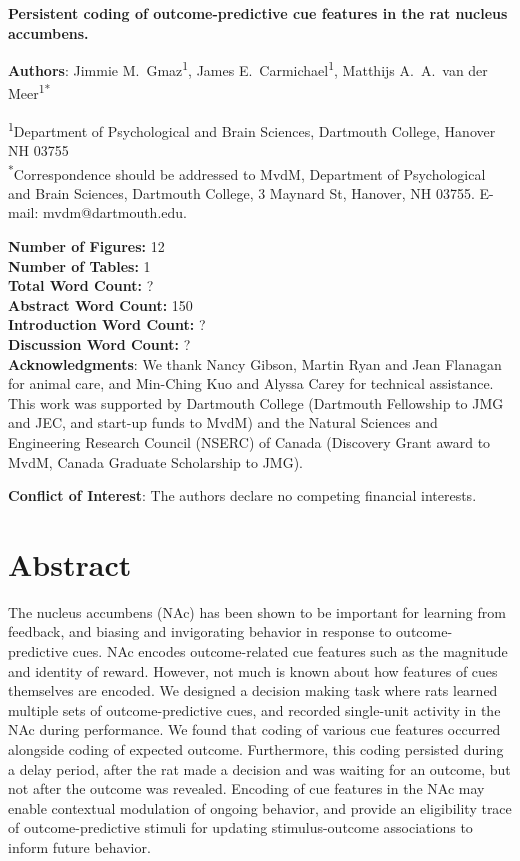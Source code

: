 \documentclass[11pt]{article}
\begin{document}
{\Large\bf Persistent coding of outcome-predictive cue features in the
  rat nucleus accumbens.}

{\bf Authors}: Jimmie M.\ Gmaz\textsuperscript{1}, James
E.\ Carmichael\textsuperscript{1}, Matthijs A.\ A.\ van der
Meer\textsuperscript{1*}

\textsuperscript{1}Department of Psychological and Brain Sciences,
Dartmouth College, Hanover NH
03755\\ 

\textsuperscript{*}Correspondence should be addressed to MvdM,
Department of Psychological and Brain Sciences, Dartmouth College, 3
Maynard St, Hanover, NH 03755. E-mail: {\sffamily mvdm@dartmouth.edu}.

\textbf{Number of Figures:} 12\\
\textbf{Number of Tables:} 1\\
\textbf{Total Word Count:} ?\\
\textbf{Abstract Word Count:} 150\\
\textbf{Introduction Word Count:} ?\\
\textbf{Discussion Word Count:} ?\\

\textbf{Acknowledgments}: We thank Nancy Gibson, Martin Ryan and Jean
Flanagan for animal care, and Min-Ching Kuo and
Alyssa Carey for technical assistance. This work was supported by
Dartmouth College (Dartmouth Fellowship to JMG and JEC, and start-up funds to
MvdM) and the Natural Sciences and Engineering Research Council
(NSERC) of Canada (Discovery Grant award to MvdM, Canada Graduate
Scholarship to JMG).

\textbf{Conflict of Interest}: The authors declare no competing
financial interests.\\

\newpage
\linenumbers

\section*{Abstract}

The nucleus accumbens (NAc) has been shown to be important for
learning from feedback, and biasing and invigorating behavior in
response to outcome-predictive cues. NAc encodes outcome-related cue
features such as the magnitude and identity of reward. However, not
much is known about how features of cues themselves are encoded.  We
designed a decision making task where rats learned multiple sets of
outcome-predictive cues, and recorded single-unit activity in the NAc
during performance. We found that coding of various cue features
occurred alongside coding of expected outcome. Furthermore, this
coding persisted during a delay period, after the rat made a decision
and was waiting for an outcome, but not after the outcome was
revealed. Encoding of cue features in the NAc may enable contextual
modulation of ongoing behavior, and provide an eligibility trace of
outcome-predictive stimuli for updating stimulus-outcome associations
to inform future behavior.
\end{document}
